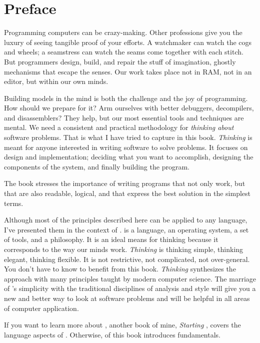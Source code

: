 \chapter*{Preface}
\pagestyle{headings}

\initial Programming computers can be crazy-making. Other professions give
you the luxury of seeing tangible proof of your efforts. A watchmaker
can watch the cogs and wheels; a seamstress can watch the seams come
together with each stitch. But programmers design, build, and repair
the stuff of imagination, ghostly mechanisms that escape the senses.
Our work takes place not in RAM, not in an editor, but within our
own minds.

Building models in the mind is both the challenge and the joy of programming.
How should we prepare for it? Arm ourselves with better debuggers,
decompilers, and disassemblers? They help, but our most essential
tools and techniques are mental. We need a consistent and practical
methodology for \emph{thinking about} software problems. That is what
I have tried to capture in this book. \emph{Thinking \Forth{}} is meant
for anyone interested in writing software to solve problems. It focuses
on design and implementation; deciding what you want to accomplish,
designing the components of the system, and finally building the program.

The book stresses the importance of writing programs that not only
work, but that are also readable, logical, and that express the best
solution in the simplest terms.

Although most of the principles described here can be applied to any
language, I've presented them in the context of \Forth{}. \Forth{} is a
language, an operating system, a set of tools, and a philosophy. It
is an ideal means for thinking because it corresponds to the way our
minds work. \emph{Thinking \Forth{}} is thinking simple, thinking elegant, thinking
flexible. It is not restrictive, not complicated, not over-general.
You don't have to know \Forth{} to benefit from this book. \emph{Thinking
\Forth{}} synthesizes the \Forth{} approach with many principles taught
by modern computer science. The marriage of \Forth{}'s simplicity with
the traditional disciplines of analysis and style will give you a
new and better way to look at software problems and will be helpful
in all areas of computer application.

If you want to learn more about \Forth{}, another book of mine,
\emph{Starting \Forth{}}, covers the language aspects of
\Forth{}. Otherwise,  of this book introduces \Forth{} fundamentals.

